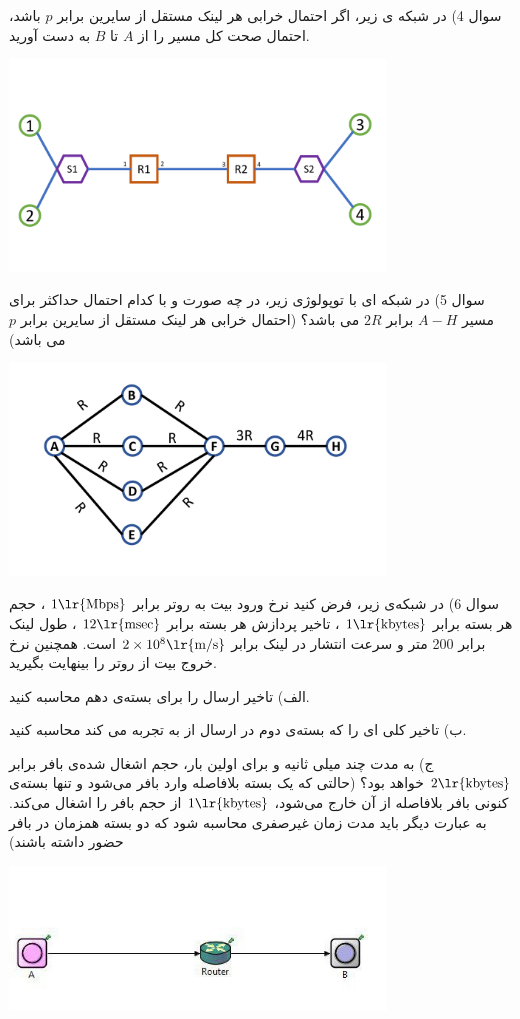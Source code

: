 \documentclass[10pt,letterpaper]{article}
\begin{document}
\noindent
سوال 4) در شبکه ی زیر، اگر احتمال خرابی هر لینک مستقل از سایرین برابر $p$ باشد، احتمال صحت کل مسیر را از $A$ تا $B$ به دست آورید.
\begin{center}
\includegraphics[width=100mm]{Q4}
\end{center}
سوال 5) در شبکه ای با توپولوژی زیر، در چه صورت و با کدام احتمال حداکثر  برای مسیر $A-H$ برابر $2R$ می باشد؟ (احتمال خرابی هر لینک مستقل از سایرین برابر $p$ می باشد)
\begin{center}
\includegraphics[width=100mm]{Q5}
\end{center}
\noindent
سوال 6) در شبکه‌ی زیر، فرض کنید نرخ ورود بیت به روتر برابر 
$1\text{\lr{Mbps}}$
، حجم هر بسته برابر 
$1\text{\lr{kbytes}}$
، تاخیر پردازش هر بسته برابر 
$12\text{\lr{msec}}$
، طول لینک برابر 200 متر و سرعت انتشار در لینک برابر 
$2\times 10^8 \text{\lr{m/s}}$
 است. همچنین  نرخ خروج بیت از روتر را بینهایت بگیرید.

الف) تاخیر ارسال را برای بسته‌ی دهم محاسبه کنید.

ب) تاخیر کلی ای را که بسته‌ی دوم در ارسال از  به  تجربه می کند محاسبه کنید.

ج) به مدت چند میلی ثانیه و برای اولین بار، حجم اشغال شده‌ی بافر برابر 
$2\text{\lr{kbytes}}$
 خواهد بود؟ (حالتی که یک بسته بلافاصله وارد بافر می‌شود و تنها بسته‌ی کنونی بافر بلافاصله از آن خارج می‌شود، $1\text{\lr{kbytes}}$ از حجم بافر را اشغال می‌کند. به عبارت دیگر باید مدت زمان غیرصفری محاسبه شود که دو بسته همزمان در بافر حضور داشته باشند)
\begin{center}
\includegraphics[width=100mm]{Q6.jpg}
\end{center}
\end{document}
